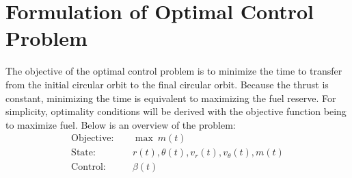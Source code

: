 \documentclass[]{article}
\begin{document}
\section{Formulation of Optimal Control Problem}
The objective of the optimal control problem is to minimize the time to transfer from the initial circular orbit to the final circular orbit. Because the thrust is constant, minimizing the time is equivalent to maximizing the fuel reserve. For simplicity, optimality conditions will be derived with the objective function being to maximize fuel. Below is an overview of the problem:
\begin{align*}
	\mathrm{Objective}:& \quad \max\ m(t) \\
	\mathrm{State}:&     \quad r(t), \theta(t), v_r(t), v_\theta(t), m(t) \\
	\mathrm{Control}:&   \quad \beta(t)
\end{align*}
\end{document}
